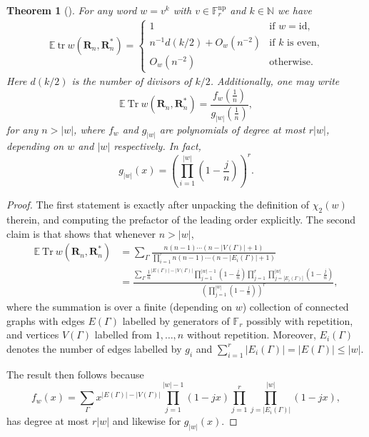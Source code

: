 \documentclass[12pt]{article}
\newtheorem{theorem}{Theorem}[section]
\renewcommand{\tr}{\mathrm{tr}}
\renewcommand{\Tr}{\mathrm{Tr}}
\newcommand{\N}{\mathbb{N}}
\newcommand{\E}{\mathbb{E}}
\newcommand{\F}{\mathbb{F}}
\newcommand{\1}{\mathds{1}}
\newcommand{\rn}{\mathbf{R}_n}
\begin{document}
\begin{theorem}[{\cite[Lemma 1.9, Theorem 1.11]{Ma.Pu2021}}]
\label{thm: magee-puder}
For any word $w=v^k$ with $v\in\F_r^\mathrm{np}$ and $k\in\N$ we have
    \begin{align*}
        \E\ \tr\ w(\rn,\rn^*) = \begin{cases}
1 & \text{if $w=\mathrm{id}$,}\\
n^{-1}d(k/2) + O_w(n^{-2}) & \text{if $k$ is even,}\\
O_w(n^{-2}) & \text{otherwise.}
        \end{cases}
    \end{align*}
Here $d(k/2)$ is the number of divisors of $k/2$. Additionally, one may write 
$$\E\ \Tr\ w(\rn,\rn^*)=\frac{f_w(\frac{1}{n})}{g_{|w|}(\frac{1}{n})},$$ 
for any $n>|w|$, where $f_w$ and $g_{|w|}$ are polynomials of degree at most $r|w|$, depending on $w$ and $|w|$ respectively. In fact, 
    $$g_{|w|}(x) = \left(\prod_{i=1}^{|w|}\left(1-\frac{j}{n}\right)\right)^r.$$
\end{theorem}

\begin{proof}
    The first statement is exactly \cite[Thm. 1.11]{Ma.Pu2021} after unpacking the definition of $\chi_2(w)$ therein, and computing the prefactor of the leading order explicitly. The second claim is \cite[Lemma 3.1]{Ma.Pu2021} that shows that whenever $n>|w|$,
        \begin{align*}
            \E\ \Tr\ w(\rn,\rn^*) &= \sum_\Gamma \frac{n(n-1)\cdots (n-|V(\Gamma)|+1)}{\prod_{i=1}^r n(n-1)\cdots(n-|E_i(\Gamma)|+1)}\\
            &=\frac{\sum_\Gamma \frac{1}{n}^{|E(\Gamma)|-|V(\Gamma)|}\prod_{j=1}^{|w|-1}\left(1-\frac{j}{n}\right)\prod_{j=1}^r\prod_{j=|E_i(\Gamma)|}^{|w|}\left(1-\frac{j}{n}\right)}{\left(\prod_{j=1}^{|w|}\left(1-\frac{j}{n}\right)\right)^r},
        \end{align*}
    where the summation is over a finite (depending on $w$) collection of connected graphs with edges $E(\Gamma)$ labelled by generators of $\F_r$ possibly with repetition, and vertices $V(\Gamma)$ labelled from $1,\ldots, n$ without repetition. Moreover, $E_i(\Gamma)$ denotes the number of edges labelled by $g_i$ and $\sum_{i=1}^r|E_i(\Gamma)|=|E(\Gamma)|\leq |w|$. 

    The result then follows because 
        $$f_w(x) = \sum_\Gamma x^{|E(\Gamma)|-|V(\Gamma)|}\prod_{j=1}^{|w|-1}\left(1-jx\right)\prod_{j=1}^r\prod_{j=|E_i(\Gamma)|}^{|w|}\left(1-jx\right),$$
    has degree at most $r|w|$ and likewise for $g_{|w|}(x)$.
\end{proof}
\end{document}

